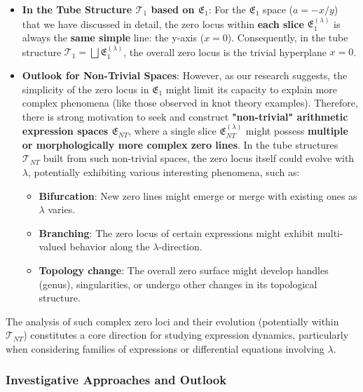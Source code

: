 \begin{itemize}
    \item \textbf{In the Tube Structure $\mathcal{T}_1$ based on $\mathfrak{E}_1$}: For the $\mathfrak{E}_1$ space ($a=-x/y$) that we have discussed in detail, the zero locus within \textbf{each slice} $\mathfrak{E}_1^{(\lambda)}$ is always the \textbf{same simple} line: the y-axis ($x=0$). Consequently, in the tube structure $\mathcal{T}_1 = \bigsqcup \mathfrak{E}_1^{(\lambda)}$, the overall zero locus is the trivial hyperplane $x=0$.

    \item \textbf{Outlook for Non-Trivial Spaces}: However, as our research suggests, the simplicity of the zero locus in $\mathfrak{E}_1$ might limit its capacity to explain more complex phenomena (like those observed in knot theory examples). Therefore, there is strong motivation to seek and construct \textbf{"non-trivial" arithmetic expression spaces $\mathfrak{E}_{NT}$}, where a single slice $\mathfrak{E}_{NT}^{(\lambda)}$ might possess \textbf{multiple or morphologically more complex zero lines}. In the tube structures $\mathcal{T}_{NT}$ built from such non-trivial spaces, the zero locus itself could evolve with $\lambda$, potentially exhibiting various interesting phenomena, such as:
    \begin{itemize}
        \item \textbf{Bifurcation}: New zero lines might emerge or merge with existing ones as $\lambda$ varies.
        \item \textbf{Branching}: The zero locus of certain expressions might exhibit multi-valued behavior along the $\lambda$-direction.
        \item \textbf{Topology change}: The overall zero surface might develop handles (genus), singularities, or undergo other changes in its topological structure.
    \end{itemize}
\end{itemize}
The analysis of such complex zero loci and their evolution (potentially within $\mathcal{T}_{NT}$) constitutes a core direction for studying expression dynamics, particularly when considering families of expressions or differential equations involving $\lambda$.

\subsubsection{Investigative Approaches and Outlook}\label{subsec:tube_outlook}


